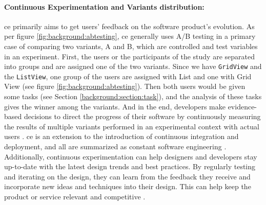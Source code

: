 \paragraph{Continuous Experimentation and Variants distribution:} 
\ac{ce} primarily aims to get users' feedback on the software product's evolution.
As per figure \ref{fig:background:abtesting}, \ac{ce} generally uses A/B testing in a primary case of comparing two variants, A and B, which are controlled and test variables in an experiment.
First, the users or the participants of the study are separated into groups and are assigned one of the two variants.
Since we have \texttt{GridView} and the \texttt{ListView}, one group of the users are assigned with List and one with Grid View (see figure \ref{fig:background:abtesting}).
Then both users would be given some tasks (see Section \ref{background:section:task}), and the analysis of these tasks gives the winner among the variants.
And in the end, developers make evidence-based decisions to direct the progress of their software by continuously measuring the results of multiple variants performed in an experimental context with actual users \cite{article:CE:ros}.
\ac{ce} is an extension to the introduction of continuous integration and deployment, and all are summarized as constant software engineering \cite{article:CE:fitzgerald}.
Additionally, continuous experimentation can help designers and developers stay up-to-date with the latest design trends and best practices. 
By regularly testing and iterating on the design, they can learn from the feedback they receive and incorporate new ideas and techniques into their design. 
This can help keep the product or service relevant and competitive \cite{article:controlled:experiements}.\\

